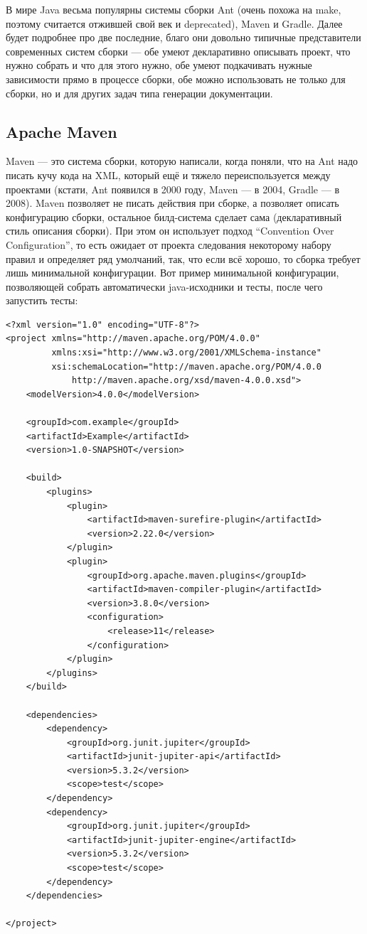 \documentclass[a5paper]{article}
\begin{document}
В мире Java весьма популярны системы сборки Ant (очень похожа на make, поэтому считается отжившей свой век и deprecated), Maven и Gradle. Далее будет подробнее про две последние, благо они довольно типичные представители современных систем сборки --- обе умеют декларативно описывать проект, что нужно собрать и что для этого нужно, обе умеют подкачивать нужные зависимости прямо в процессе сборки, обе можно использовать не только для сборки, но и для других задач типа генерации документации.

\subsection{Apache Maven}

Maven --- это система сборки, которую написали, когда поняли, что на Ant надо писать кучу кода на XML, который ещё и тяжело переиспользуется между проектами (кстати, Ant появился в 2000 году, Maven --- в 2004, Gradle --- в 2008). Maven позволяет не писать действия при сборке, а позволяет описать конфигурацию сборки, остальное билд-система сделает сама (декларативный стиль описания сборки). При этом он использует подход ``Convention Over Configuration'', то есть ожидает от проекта следования некоторому набору правил и определяет ряд умолчаний, так, что если всё хорошо, то сборка требует лишь минимальной конфигурации. Вот пример минимальной конфигурации, позволяющей собрать автоматически java-исходники и тесты, после чего запустить тесты:

\begin{verbatim}
<?xml version="1.0" encoding="UTF-8"?>
<project xmlns="http://maven.apache.org/POM/4.0.0"
         xmlns:xsi="http://www.w3.org/2001/XMLSchema-instance"
         xsi:schemaLocation="http://maven.apache.org/POM/4.0.0 
             http://maven.apache.org/xsd/maven-4.0.0.xsd">
    <modelVersion>4.0.0</modelVersion>

    <groupId>com.example</groupId>
    <artifactId>Example</artifactId>
    <version>1.0-SNAPSHOT</version>

    <build>
        <plugins>
            <plugin>
                <artifactId>maven-surefire-plugin</artifactId>
                <version>2.22.0</version>
            </plugin>
            <plugin>
                <groupId>org.apache.maven.plugins</groupId>
                <artifactId>maven-compiler-plugin</artifactId>
                <version>3.8.0</version>
                <configuration>
                    <release>11</release>
                </configuration>
            </plugin>
        </plugins>
    </build>

    <dependencies>
        <dependency>
            <groupId>org.junit.jupiter</groupId>
            <artifactId>junit-jupiter-api</artifactId>
            <version>5.3.2</version>
            <scope>test</scope>
        </dependency>
        <dependency>
            <groupId>org.junit.jupiter</groupId>
            <artifactId>junit-jupiter-engine</artifactId>
            <version>5.3.2</version>
            <scope>test</scope>
        </dependency>
    </dependencies>

</project>
\end{verbatim}
\end{document}
